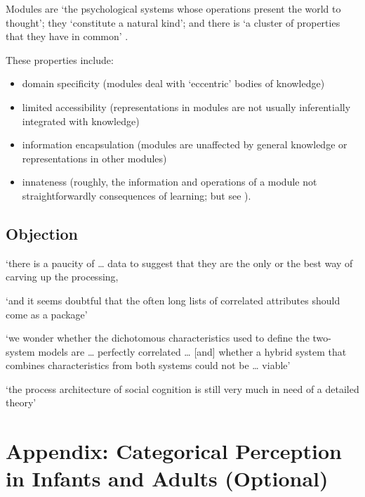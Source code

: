 \documentclass[12pt]{extarticle}
\begin{document}
\begin{multicols}{3}
Modules are ‘the psychological systems whose operations present the world to thought’; they ‘constitute a natural kind’; and there is ‘a cluster of properties that they have in common’ \citep[p.\ 101]{Fodor:1983dg}.
 
These properties include:
 
\begin{itemize}
 
\item domain specificity (modules deal with ‘eccentric’ bodies of knowledge)
 
\item limited accessibility (representations in modules are not usually inferentially integrated with knowledge)
 
\item information encapsulation (modules are unaffected by general knowledge or representations in other modules)
 
\item innateness (roughly, the information and operations of a module not straightforwardly consequences of learning; but see \citet{Samuels:2004ho}).
 
\end{itemize}
 
\subsection{Objection}
 
‘there is a paucity of … data to suggest that they are the only or the best way of carving up the processing,
 
‘and it seems doubtful that the often long lists of correlated attributes should come as a package’
\citep[p.\ 759]{adolphs_conceptual_2010}
 
‘we wonder whether the dichotomous characteristics used to define the two-system models are … perfectly correlated …
[and] whether a hybrid system that combines characteristics from both systems could not be … viable’
\citep[p.\ 537]{keren_two_2009}
 
‘the process architecture of social cognition is still very much in need of a detailed theory’
\citep[p.\ 759]{adolphs_conceptual_2010}
\citep[p.\ 517]{Carey:1996hl}
 
 
 
\section{Appendix: Categorical Perception in Infants and Adults (Optional)}
 

\end{multicols}
\end{document}

